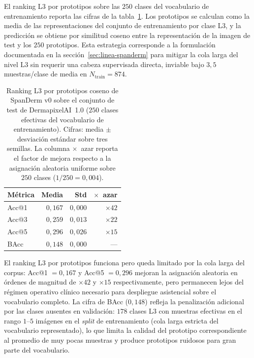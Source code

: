 El ranking L3 por prototipos sobre las $250$ clases del
vocabulario de entrenamiento reporta las cifras de la
tabla~\ref{tab:dermapixel-spanderm-l3}. Los prototipos se calculan
como la media de las representaciones del conjunto de
entrenamiento por clase L3, y la predicción se obtiene por
similitud coseno entre la representación de la imagen de test y
los $250$ prototipos. Esta estrategia corresponde a la
formulación documentada en la secci\'on~\ref{sec:linea-spanderm}
para mitigar la cola larga del nivel L3 sin requerir una cabeza
supervisada directa, inviable bajo $3{,}5$ muestras/clase de
media en $N_{\mathrm{train}} = 874$.

\begin{table}[H]
\centering
\footnotesize
\setlength{\tabcolsep}{4pt}
\renewcommand{\arraystretch}{0.95}
\caption{Ranking L3 por prototipos coseno de SpanDerm v0 sobre el
conjunto de test de DermapixelAI~1.0 ($250$ clases efectivas
del vocabulario de entrenamiento). Cifras: media $\pm$ desviación
estándar sobre tres semillas. La columna $\times$~azar reporta el
factor de mejora respecto a la asignación aleatoria uniforme
sobre $250$ clases ($1/250 = 0{,}004$).}
\label{tab:dermapixel-spanderm-l3}
\begin{tabular}{lrrr}
\hline
Métrica & Media                 & Std            & $\times$~azar \\
\hline
Acc@1   & $0{,}167$             & $0{,}000$      & $\times 42$ \\
Acc@3   & $0{,}259$             & $0{,}013$      & $\times 22$ \\
Acc@5   & $0{,}296$             & $0{,}026$      & $\times 15$ \\
BAcc    & $0{,}148$             & $0{,}000$      & --- \\
\hline
\end{tabular}
\end{table}

El ranking L3 por prototipos funciona pero queda limitado por la
cola larga del corpus: Acc@1 $= 0{,}167$ y Acc@5 $= 0{,}296$
mejoran la asignación aleatoria en órdenes de magnitud de
$\times 42$ y $\times 15$ respectivamente, pero permanecen lejos
del régimen operativo clínico necesario para despliegue
asistencial sobre el vocabulario completo. La cifra de BAcc
($0{,}148$) refleja la penalización adicional por las clases
ausentes en validación: $178$ clases L3 con muestras efectivas
en el rango $1$--$5$ imágenes en el \emph{split} de entrenamiento
(cola larga estricta del vocabulario representado), lo que limita la calidad del prototipo
correspondiente al promedio de muy pocas muestras y produce
prototipos ruidosos para gran parte del vocabulario.

